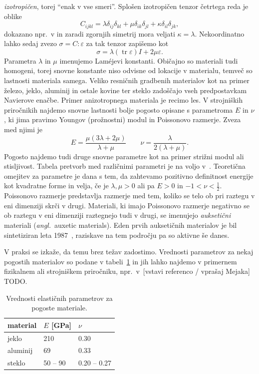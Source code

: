 \documentclass[12pt,a4paper,twoside]{article}
\theoremstyle{definition} %
\theoremstyle{plain} %
\numberwithin{equation}{section}
\newcommand{\eps}{\varepsilon}
\newcommand{\ts}{\sigma}
\DeclareMathOperator{\tr}{tr}
\newcommand{\ang}[1]{(\textit{angl.}\ #1)}
\begin{document}
\emph{izotropičen}, torej ``enak v vse smeri''. Splošen izotropičen tenzor
četrtega reda je oblike
\[
  C_{ijkl} = \lambda \delta_{ij}\delta_{kl} + \mu \delta_{ik}\delta_{jl} +
  \kappa \delta_{il}\delta_{jk},
\]
dokazano npr.~v\cite[str.\ 206, primer 4.2.2]{liu2013continuum} in zaradi zgornjih simetrij
mora veljati $\kappa = \lambda$.
Nekoordinatno lahko sedaj zvezo $\ts = C:\eps$ za tak tenzor zapišemo kot
\begin{equation}
  \ts = \lambda (\tr\eps)I + 2\mu \eps.
  \label{eq:hooke-isotropic}
\end{equation}
Parametra $\lambda$ in $\mu$ imenujemo Lam\'{e}jevi konstanti.
Običajno so materiali tudi homogeni, torej snovne konstante niso odvisne od
lokacije v materialu, temveč so lastnosti materiala samega.
Veliko resničnih gradbenih materialov kot na primer železo, jeklo, aluminij in
ostale kovine ter steklo zadoščajo vseh predpostavkam Navierove enačbe. Primer
anizotropnega materiala je recimo les.  V strojniških priročnikih najdemo snovne
lastnosti bolje pogosto opisane s parametroma $E$ in $\nu$, ki jima pravimo
Youngov (prožnostni) modul in Poissonovo razmerje. Zveza med njimi je
\[
  E = \frac{\mu(3\lambda+2\mu)}{\lambda+\mu} \qquad \nu =
  \frac{\lambda}{2(\lambda+\mu)}.
\]
Pogosto najdemo tudi druge snovne parametre kot na primer strižni modul ali
stisljivost. Tabela pretvorb med različnimi parametri je na voljo v~\cite[tabela
5.1, str.\ 215]{slaughter2012linearized}. Teoretična omejitev za parametre je
dana s tem, da zahtevamo pozitivno definitnost energije kot kvadratne forme in
velja, če je $\lambda, \mu > 0$ ali pa $E > 0$ in $-1 < \nu < \frac12$.
Poissonovo razmerje predstavlja razmerje med tem, koliko se telo ob pri raztegu v eni dimenziji
skrči v drugi. Materiali, ki imajo Poissonovo razmerje negativno se ob raztegu v eni dimenziji
raztegnejo tudi v drugi, se imenujejo \emph{auksetični} materiali \ang{auxetic materials}.
Eden prvih auksetičnih materialov je bil sintetiziran leta 1987~\cite{lakes1987foam}, raziskave na
tem področju pa so aktivne še danes.

V praksi se izkaže, da temu brez težav zadostimo. Vrednosti parametrov za nekaj
pogostih materialov so podane v tabeli~\ref{tab:Enu} in jih lahko najdemo v
primernem fizikalnem ali strojniškem priročniku, npr.\ v~[vstavi referenco / vprašaj
Mejaka] TODO.
\begin{table}[h]
  \centering
  \begin{tabular}{|l|l|l|} \hline
    material & $E$ [\unit{GPa}] & $\nu$ \\ \hline
    jeklo    & 210 & 0.30 \\
    aluminij & 69 & 0.33 \\
    steklo   & 50 -- 90 & 0.20 -- 0.27 \\ \hline
  \end{tabular}
  \caption{Vrednosti elastičnih parametrov za pogoste materiale.}
  \label{tab:Enu}
\end{table}
\end{document}

